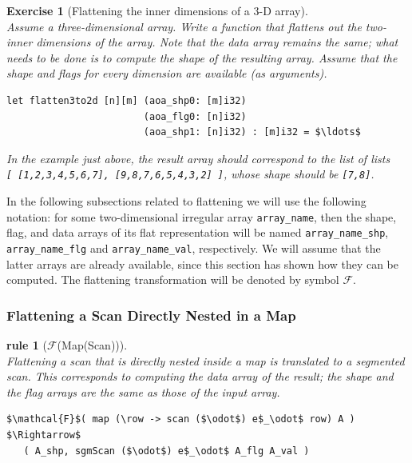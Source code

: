 \documentclass[acmsmall,review]{acmart}\settopmatter{printfolios=true,printccs=false,printacmref=false}
\newtheorem{myexerc}{Exercise}
\newtheorem{rewrite}{rule}
\begin{document}
\begin{myexerc}[Flattening the inner dimensions of a 3-D array]\label{Flat-Inner-Arr-Dim}
$\mbox{ }$\\
Assume a three-dimensional array. Write a function that flattens 
out the two-inner dimensions of the array. Note that the data
array remains the same; what needs to be done is to compute the
shape of the resulting array.  Assume that the shape and flags
for every dimension are available (as arguments).

\begin{lstlisting}[mathescape=true]
let flatten3to2d [n][m] (aoa_shp0: [m]i32) 
                        (aoa_flg0: [n]i32)
                        (aoa_shp1: [n]i32) : [m]i32 = $\ldots$
\end{lstlisting}\vspace{-2ex}

In the example just above, the result array should correspond to
the list of lists\\ {\tt [ [1,2,3,4,5,6,7], [9,8,7,6,5,4,3,2] ]},
whose shape should be {\tt [7,8]}.
\end{myexerc}

In the following subsections related to flattening we will use the
following notation: for some two-dimensional irregular array 
{\tt array\_name}, then the shape, flag, and data arrays of its 
flat representation will be named {\tt array\_name\_shp}, 
{\tt array\_name\_flg} and {\tt array\_name\_val}, respectively.
We will assume that the latter arrays are already available,
since this section has shown how they can be computed.
The flattening transformation will be denoted by symbol $\mathcal{F}$. 

\subsubsection{Flattening a Scan Directly Nested in a Map}
\label{subsubsec:scan-in-map} 

\begin{rewrite}[$\mathcal{F}$(Map(Scan))]\label{Flat-Scan-In-Map}
$\mbox{ }$\\
Flattening a scan that is directly nested inside a map is translated to a
segmented scan. This corresponds to computing the data array of the result; 
the shape and the flag arrays are the same as those of the input array.
\begin{lstlisting}[mathescape=true]
$\mathcal{F}$( map (\row -> scan ($\odot$) e$_\odot$ row) A ) $\Rightarrow$
   ( A_shp, sgmScan ($\odot$) e$_\odot$ A_flg A_val )
\end{lstlisting}\vspace{-2ex}
\end{rewrite}
\end{document}

